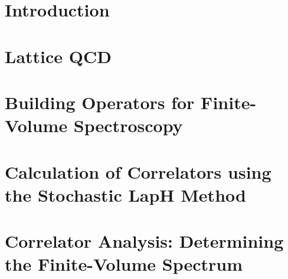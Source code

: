 \documentclass[12pt]{report}
\begin{document}
\onehalfspace


% 
\tableofcontents

\chapter{Introduction}\label{ch:introduction}


\chapter{Lattice QCD}\label{ch:latticeqcd}


\chapter{Building Operators for Finite-Volume Spectroscopy}\label{ch:operators}


\chapter{Calculation of Correlators using the Stochastic LapH Method}\label{ch:montecarlo}


\chapter{Correlator Analysis: Determining the Finite-Volume Spectrum}\label{ch:analysis}

\end{document}

